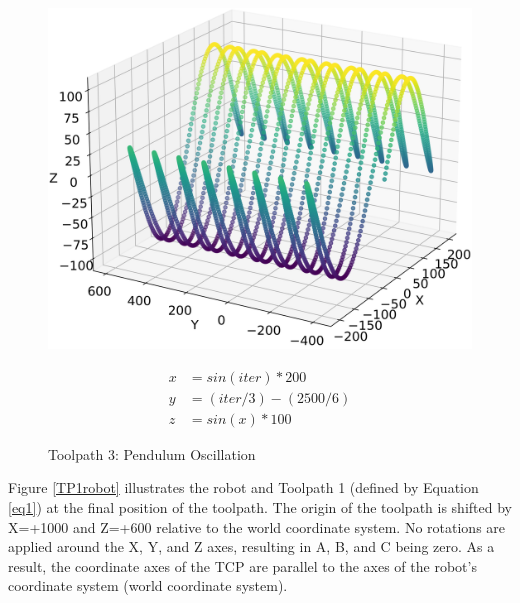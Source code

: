 \begin{figure}[H]%
	\centering
	\begin{minipage}{0.5\textwidth}
		\includegraphics[width=\textwidth]{figures/path3.png}
		\caption{Toolpath 3: Pendulum Oscillation}
		\label{path3}
	\end{minipage}\hfill
	\begin{minipage}{0.5\textwidth}
		\begin{equation}\label{eq3}
			\begin{split}
				x &= sin(iter) * 200\\
				y &= (iter / 3) - (2500/6)\\
				z &= sin(x)*100
			\end{split}
		\end{equation}
	\end{minipage}\par
\end{figure}

\newpage
Figure \ref{TP1robot} illustrates the robot and Toolpath 1 (defined by Equation \ref{eq1}) at the final position of the toolpath. The origin of the toolpath is shifted by X=+1000 and Z=+600 relative to the world coordinate system. No rotations are applied around the X, Y, and Z axes, resulting in A, B, and C being zero. As a result, the coordinate axes of the \acrshort{TCP} are parallel to the axes of the robot's coordinate system (world coordinate system).




